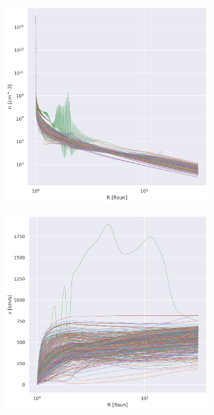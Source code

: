 \begin{figure}[ht]
     \centering
     \begin{subfigure}[b]{0.32\textwidth}
         \centering
         \includegraphics[width=\textwidth]{figures/volume_radius.png}
     \end{subfigure}
     \hfill
     \begin{subfigure}[b]{0.32\textwidth}
         \centering
         \includegraphics[width=\textwidth]{figures/velocity_radius.png}

\end{subfigure}
\end{figure}
